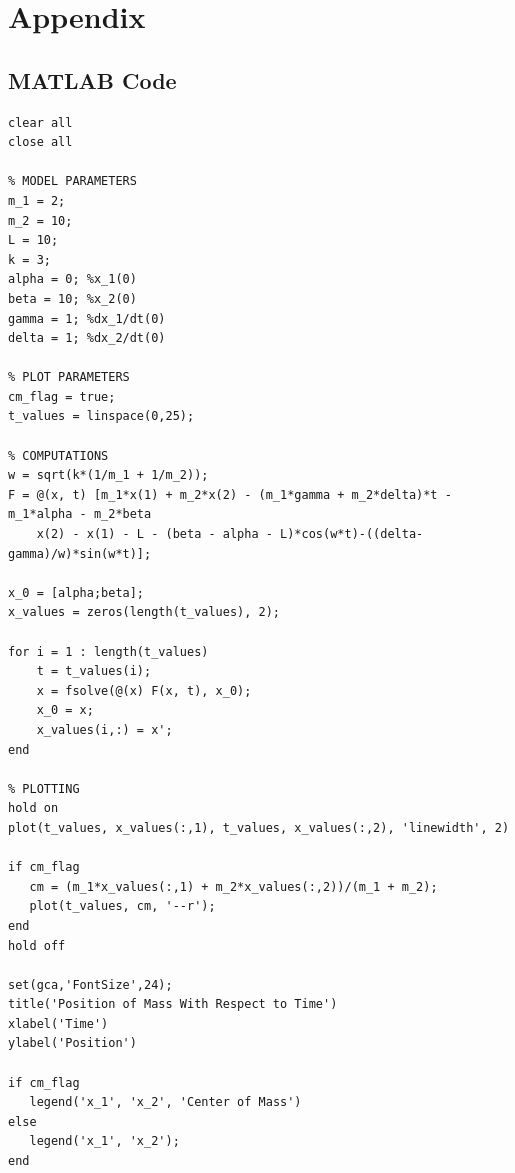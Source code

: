 \documentclass[11pt, oneside]{article}   	%
\begin{document}
\section{Appendix}
\subsection{MATLAB Code}
\begin{lstlisting}
clear all
close all

% MODEL PARAMETERS
m_1 = 2;
m_2 = 10;
L = 10;
k = 3;
alpha = 0; %x_1(0)
beta = 10; %x_2(0)
gamma = 1; %dx_1/dt(0)
delta = 1; %dx_2/dt(0)

% PLOT PARAMETERS
cm_flag = true;
t_values = linspace(0,25);

% COMPUTATIONS
w = sqrt(k*(1/m_1 + 1/m_2));
F = @(x, t) [m_1*x(1) + m_2*x(2) - (m_1*gamma + m_2*delta)*t - m_1*alpha - m_2*beta
    x(2) - x(1) - L - (beta - alpha - L)*cos(w*t)-((delta-gamma)/w)*sin(w*t)];

x_0 = [alpha;beta];
x_values = zeros(length(t_values), 2);

for i = 1 : length(t_values)
    t = t_values(i);
    x = fsolve(@(x) F(x, t), x_0);
    x_0 = x;
    x_values(i,:) = x';
end

% PLOTTING
hold on
plot(t_values, x_values(:,1), t_values, x_values(:,2), 'linewidth', 2)

if cm_flag
   cm = (m_1*x_values(:,1) + m_2*x_values(:,2))/(m_1 + m_2);
   plot(t_values, cm, '--r');
end
hold off

set(gca,'FontSize',24);
title('Position of Mass With Respect to Time')
xlabel('Time')
ylabel('Position')

if cm_flag
   legend('x_1', 'x_2', 'Center of Mass') 
else
   legend('x_1', 'x_2');
end
\end{lstlisting}
\end{document}
